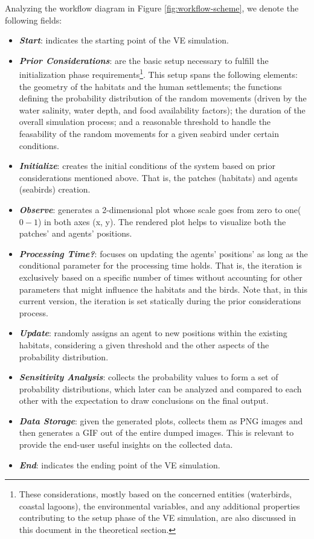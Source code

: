 Analyzing the workflow diagram in Figure \ref{fig:workflow-scheme}, we denote the following fields:
\begin{itemize}
    \item \textbf{\textit{Start}}: indicates the starting point of the VE simulation.
    \item \textbf{\textit{Prior Considerations}}: are the basic setup necessary to fulfill the initialization phase requirements\footnote{These considerations, mostly based on the concerned entities (waterbirds, coastal lagoons), the environmental variables, and any additional properties contributing to the setup phase of the VE simulation, are also discussed in this document in the theoretical section.}. This setup spans the following elements: the geometry of the habitats and the human settlements; the functions defining the probability distribution of the random movements (driven by the water salinity, water depth, and food availability factors); the duration of the overall simulation process; and a reasonable threshold to handle the feasability of the random movements for a given seabird under certain conditions.
    \item \textbf{\textit{Initialize}}: creates the initial conditions of the system based on prior considerations mentioned above. That is, the patches (habitats) and agents (seabirds) creation.
    \item \textbf{\textit{Observe}}: generates a 2-dimensional plot whose scale goes from zero to one(\emph{$0-1$}) in both axes (x, y). The rendered plot helps to visualize both the patches' and agents' positions.
    \item \textbf{\textit{Processing Time?}}: focuses on updating the agents' positions' as long as the conditional parameter for the processing time holds. That is, the iteration is exclusively based on a specific number of times without accounting for other parameters that might influence the habitats and the birds. Note that, in this current version, the iteration is set statically during the prior considerations process.
    \item \textbf{\textit{Update}}: randomly assigns an agent to new positions within the existing habitats, considering a given threshold and the other aspects of the probability distribution.
    \item \textbf{\textit{Sensitivity Analysis}}: collects the probability values to form a set of probability distributions, which later can be analyzed and compared to each other with the expectation to draw conclusions on the final output.
    \item \textbf{\textit{Data Storage}}: given the generated plots, collects  them as PNG images and then generates a GIF out of the entire dumped images. This is relevant to provide the end-user useful insights on the collected data.
    \item \textbf{\textit{End}}: indicates the ending point of the VE simulation.
\end{itemize}

